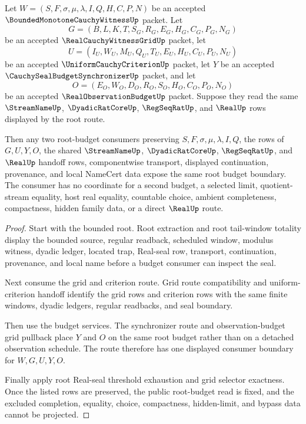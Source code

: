 \begin{theorem}
\label{thm:bounded-monotone-cauchy-witness-root-budget-consumer-exactness}
Let $W=(S,F,\sigma,\mu,\lambda,I,Q,H,C,P,N)$ be an accepted $\BoundedMonotoneCauchyWitnessUp$ packet. Let
$$
G=(B,L,K,T,S_G,R_G,E_G,H_G,C_G,P_G,N_G)
$$
be an accepted $\RealCauchyWitnessGridUp$ packet, let
$$
U=(I_U,W_U,M_U,Q_U,T_U,E_U,H_U,C_U,P_U,N_U)
$$
be an accepted $\UniformCauchyCriterionUp$ packet, let $Y$ be an accepted $\CauchySealBudgetSynchronizerUp$ packet, and let
$$
O=(E_O,W_O,D_O,R_O,S_O,H_O,C_O,P_O,N_O)
$$
be an accepted $\RealObservationBudgetUp$ packet. Suppose they read the same $\StreamNameUp$, $\DyadicRatCoreUp$, $\RegSeqRatUp$, and $\RealUp$ rows displayed by the root route.

Then any two root-budget consumers preserving $S,F,\sigma,\mu,\lambda,I,Q$, the rows of $G,U,Y,O$, the shared $\StreamNameUp$, $\DyadicRatCoreUp$, $\RegSeqRatUp$, and $\RealUp$ handoff rows, componentwise transport, displayed continuation, provenance, and local NameCert data expose the same root budget boundary. The consumer has no coordinate for a second budget, a selected limit, quotient-stream equality, host real equality, countable choice, ambient completeness, compactness, hidden family data, or a direct $\RealUp$ route.
\end{theorem}
\begin{proof}
Start with the bounded root. Root extraction and root tail-window totality display the bounded source, regular readback, scheduled window, modulus witness, dyadic ledger, located trap, Real-seal row, transport, continuation, provenance, and local name before a budget consumer can inspect the seal.

Next consume the grid and criterion route. Grid route compatibility and uniform-criterion handoff identify the grid rows and criterion rows with the same finite windows, dyadic ledgers, regular readbacks, and seal boundary.

Then use the budget services. The synchronizer route and observation-budget grid pullback place $Y$ and $O$ on the same root budget rather than on a detached observation schedule. The route therefore has one displayed consumer boundary for $W,G,U,Y,O$.

Finally apply root Real-seal threshold exhaustion and grid selector exactness. Once the listed rows are preserved, the public root-budget read is fixed, and the excluded completion, equality, choice, compactness, hidden-limit, and bypass data cannot be projected.
\end{proof}

